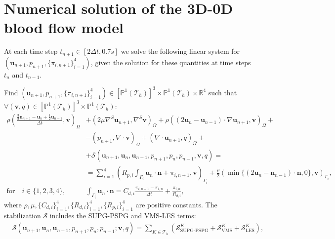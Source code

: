 \section{Numerical solution of the 3D-0D blood flow model}
\label{appendix:weak}
At each time step $t_{n+1}\in[2\Delta t,0.7s]$ we solve the following linear system for $(\mathbf{u}_{n+1}, p_{n+1}, \{\pi_{i,n+1}\}_{i=1}^{4})$, given the solution for these quantities at time
steps $t_{n}$ and $t_{n-1}$. 

\begin{problem}
  \label{def:weak_ins_w}
  Find $(\mathbf{u}_{n+1}, p_{n+1}, \{\pi_{i,n+1}\}_{i=1}^{4})\in[\mathbb{P}^1(\mathcal{T}_h)]^3\times\mathbb{P}^1(\mathcal{T}_h)\times\mathbb{R}^4$ such that $\forall(\mathbf{v},q)\in [\mathbb{P}^1(\mathcal{T}_h)]^3\times\mathbb{P}^1(\mathcal{T}_h)$:
  \begin{subequations}\begin{align*}
    \rho\left(\frac{\tfrac{3}{2}\mathbf{u}_{n+1}-\mathbf{u}_{n}+\tfrac{1}{2}\mathbf{u}_{n-1}}{\Delta t},\mathbf{v}\right)_{\Omega}&+\left(2\mu\nabla^S\mathbf{u}_{n+1}, \nabla^S\mathbf{v}\right)_{\Omega} + \rho\left((2\mathbf{u}_n-\mathbf{u}_{n-1})\cdot\nabla\mathbf{u}_{n+1},\mathbf{v}\right)_{\Omega}+\\
    &-(p_{n+1},\nabla\cdot\mathbf{v})_{\Omega}+(\nabla\cdot\mathbf{u}_{n+1}, q)_{\Omega}+\\
    &+\mathcal{S}(\mathbf{u}_{n+1}, \mathbf{u}_{n}, \mathbf{u}_{n-1},p_{n+1}, p_{n}, p_{n-1},\mathbf{v}, q) =\\
    &= \sum_{i=1}^4\left(R_{p,i}\int_{\Gamma_i}\mathbf{u}_{n}\cdot\mathbf{n}+\pi_{i,n+1},\mathbf{v}\right)_{\Gamma_i}+\tfrac{\rho}{2}\left(\min\{(2\mathbf{u}_{n}-\mathbf{n}_{n-1})\cdot\mathbf{n},0\},\mathbf{v}\right)_{\Gamma_i},\\
    \text{for}\quad i\in\{1, 2,3,4\},\qquad &\int_{\Gamma_i}\mathbf{u}_{n}\cdot\mathbf{n}=C_{d,i}\frac{\pi_{i, n+1}-\pi_{i, n}}{\Delta t}+\frac{\pi_{i,n}}{R_{d,i}},
  \end{align*}\end{subequations}
  where $\rho,\mu, \{C_{d, i}\}_{i=1}^4, \{R_{d, i}\}_{i=1}^4, \{R_{p, i}\}_{i=1}^4$ are positive constants. The stabilization $\mathcal{S}$ includes the SUPG-PSPG and VMS-LES terms:
  \begin{subequations}\begin{align*}
    &\mathcal{S}(\mathbf{u}_{n+1}, \mathbf{u}_{n}, \mathbf{u}_{n-1},p_{n+1}, p_{n}, p_{n-1};\mathbf{v}, q) = \sum_{K\in\mathcal{T}_h}(\mathcal{S}_{\text{SUPG-PSPG}}^K+\mathcal{S}_{\text{VMS}}^K+\mathcal{S}_{\text{LES}}^K),\\

\end{align*}
\end{subequations}
\end{problem}

